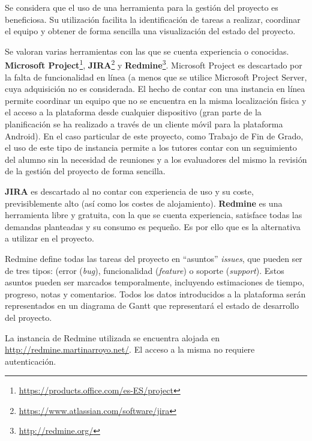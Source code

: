 Se considera que el uso de una herramienta para la gestión del proyecto es beneficiosa. Su utilización facilita la identificación de tareas a realizar, coordinar el equipo y obtener de forma sencilla una visualización del estado del proyecto.

Se valoran varias herramientas con las que se cuenta experiencia o conocidas. \textbf{Microsoft Project}\footnote{\href{https://products.office.com/es-ES/project}{https://products.office.com/es-ES/project}}, \textbf{JIRA}\footnote{\href{https://www.atlassian.com/software/jira}{https://www.atlassian.com/software/jira}} y \textbf{Redmine}\footnote{\href{http://redmine.org/}{http://redmine.org/}}. Microsoft Project es descartado por la falta de funcionalidad en línea (a menos que se utilice Microsoft Project Server, cuya adquisición no es considerada. El hecho de contar con una instancia en línea permite coordinar un equipo que no se encuentra en la misma localización física y el acceso a la plataforma desde cualquier dispositivo (gran parte de la planificación se ha realizado a través de un cliente móvil para la plataforma Android). En el caso particular de este proyecto, como Trabajo de Fin de Grado, el uso de este tipo de instancia permite a los tutores contar con un seguimiento del alumno sin la necesidad de reuniones y a los evaluadores del mismo la revisión de la gestión del proyecto de forma sencilla.

\textbf{JIRA} es descartado al no contar con experiencia de uso y su coste, previsiblemente alto (así como los costes de alojamiento). \textbf{Redmine} es una herramienta libre y gratuita, con la que se cuenta experiencia, satisface todas las demandas planteadas y su consumo es pequeño. Es por ello que es la alternativa a utilizar en el proyecto.

Redmine define todas las tareas del proyecto en ``asuntos'' \textit{issues}, que pueden ser de tres tipos: (error (\textit{bug}), funcionalidad (\textit{feature}) o soporte (\textit{support}). Estos asuntos pueden ser marcados temporalmente, incluyendo estimaciones de tiempo, progreso, notas y comentarios. Todos los datos introducidos a la plataforma serán representados en un diagrama de Gantt que representará el estado de desarrollo del proyecto.

La instancia de Redmine utilizada se encuentra alojada en \href{http://redmine.martinarroyo.net/}{http://redmine.martinarroyo.net/}. El acceso a la misma no requiere autenticación.

